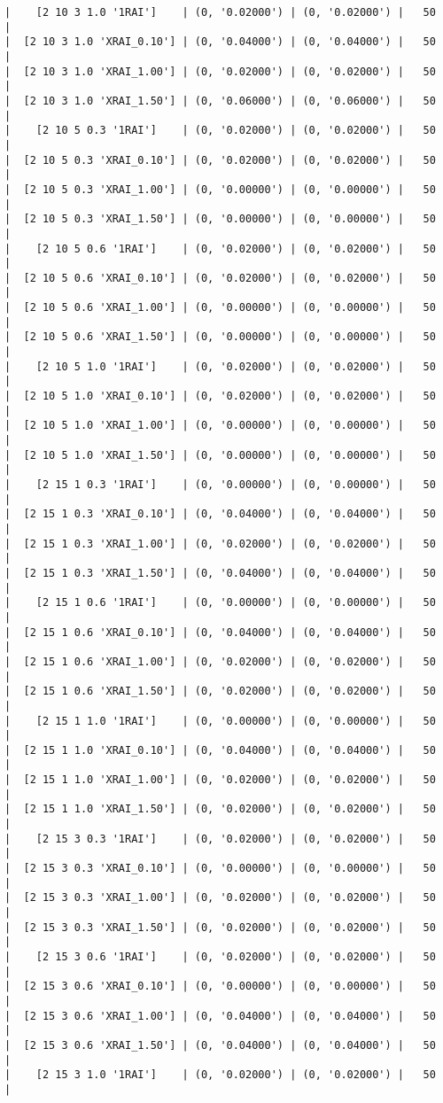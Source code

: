 \documentclass{article}
\begin{document}
\begin{verbatim}
|    [2 10 3 1.0 '1RAI']    | (0, '0.02000') | (0, '0.02000') |   50  |
|  [2 10 3 1.0 'XRAI_0.10'] | (0, '0.04000') | (0, '0.04000') |   50  |
|  [2 10 3 1.0 'XRAI_1.00'] | (0, '0.02000') | (0, '0.02000') |   50  |
|  [2 10 3 1.0 'XRAI_1.50'] | (0, '0.06000') | (0, '0.06000') |   50  |
|    [2 10 5 0.3 '1RAI']    | (0, '0.02000') | (0, '0.02000') |   50  |
|  [2 10 5 0.3 'XRAI_0.10'] | (0, '0.02000') | (0, '0.02000') |   50  |
|  [2 10 5 0.3 'XRAI_1.00'] | (0, '0.00000') | (0, '0.00000') |   50  |
|  [2 10 5 0.3 'XRAI_1.50'] | (0, '0.00000') | (0, '0.00000') |   50  |
|    [2 10 5 0.6 '1RAI']    | (0, '0.02000') | (0, '0.02000') |   50  |
|  [2 10 5 0.6 'XRAI_0.10'] | (0, '0.02000') | (0, '0.02000') |   50  |
|  [2 10 5 0.6 'XRAI_1.00'] | (0, '0.00000') | (0, '0.00000') |   50  |
|  [2 10 5 0.6 'XRAI_1.50'] | (0, '0.00000') | (0, '0.00000') |   50  |
|    [2 10 5 1.0 '1RAI']    | (0, '0.02000') | (0, '0.02000') |   50  |
|  [2 10 5 1.0 'XRAI_0.10'] | (0, '0.02000') | (0, '0.02000') |   50  |
|  [2 10 5 1.0 'XRAI_1.00'] | (0, '0.00000') | (0, '0.00000') |   50  |
|  [2 10 5 1.0 'XRAI_1.50'] | (0, '0.00000') | (0, '0.00000') |   50  |
|    [2 15 1 0.3 '1RAI']    | (0, '0.00000') | (0, '0.00000') |   50  |
|  [2 15 1 0.3 'XRAI_0.10'] | (0, '0.04000') | (0, '0.04000') |   50  |
|  [2 15 1 0.3 'XRAI_1.00'] | (0, '0.02000') | (0, '0.02000') |   50  |
|  [2 15 1 0.3 'XRAI_1.50'] | (0, '0.04000') | (0, '0.04000') |   50  |
|    [2 15 1 0.6 '1RAI']    | (0, '0.00000') | (0, '0.00000') |   50  |
|  [2 15 1 0.6 'XRAI_0.10'] | (0, '0.04000') | (0, '0.04000') |   50  |
|  [2 15 1 0.6 'XRAI_1.00'] | (0, '0.02000') | (0, '0.02000') |   50  |
|  [2 15 1 0.6 'XRAI_1.50'] | (0, '0.02000') | (0, '0.02000') |   50  |
|    [2 15 1 1.0 '1RAI']    | (0, '0.00000') | (0, '0.00000') |   50  |
|  [2 15 1 1.0 'XRAI_0.10'] | (0, '0.04000') | (0, '0.04000') |   50  |
|  [2 15 1 1.0 'XRAI_1.00'] | (0, '0.02000') | (0, '0.02000') |   50  |
|  [2 15 1 1.0 'XRAI_1.50'] | (0, '0.02000') | (0, '0.02000') |   50  |
|    [2 15 3 0.3 '1RAI']    | (0, '0.02000') | (0, '0.02000') |   50  |
|  [2 15 3 0.3 'XRAI_0.10'] | (0, '0.00000') | (0, '0.00000') |   50  |
|  [2 15 3 0.3 'XRAI_1.00'] | (0, '0.02000') | (0, '0.02000') |   50  |
|  [2 15 3 0.3 'XRAI_1.50'] | (0, '0.02000') | (0, '0.02000') |   50  |
|    [2 15 3 0.6 '1RAI']    | (0, '0.02000') | (0, '0.02000') |   50  |
|  [2 15 3 0.6 'XRAI_0.10'] | (0, '0.00000') | (0, '0.00000') |   50  |
|  [2 15 3 0.6 'XRAI_1.00'] | (0, '0.04000') | (0, '0.04000') |   50  |
|  [2 15 3 0.6 'XRAI_1.50'] | (0, '0.04000') | (0, '0.04000') |   50  |
|    [2 15 3 1.0 '1RAI']    | (0, '0.02000') | (0, '0.02000') |   50  |

\end{verbatim}
\end{document}

